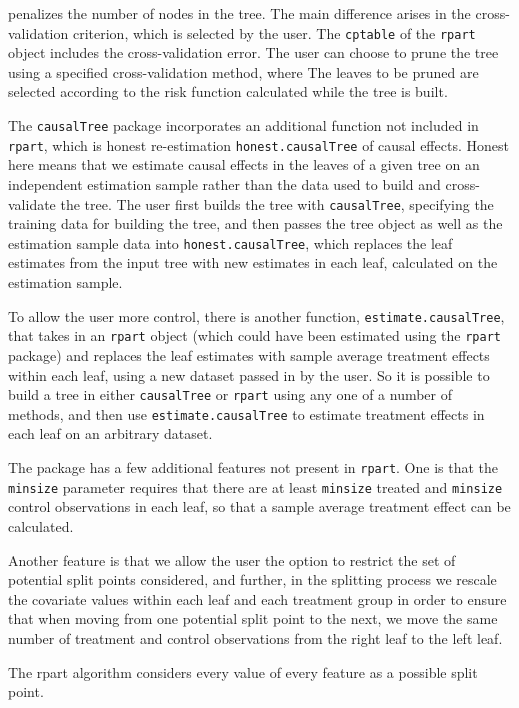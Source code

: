 \documentclass[11pt]{article}
\begin{document}
penalizes the number of nodes in the tree.  The main difference arises in the cross-validation criterion, which is 
selected by the user.  The \texttt{cptable} of the \texttt{rpart} object includes the cross-validation error.   The user can choose to prune the tree using a specified cross-validation method, where  The leaves to be pruned are selected according to the risk function calculated while
the tree is built. \par
The \texttt{causalTree} package incorporates an additional function not included in \texttt{rpart}, which is honest re-estimation \texttt{honest.causalTree} of causal effects. Honest here means that we estimate causal effects in the leaves of a given tree on an independent estimation sample rather than the data used to build and cross-validate the tree.  The user first builds the tree
with \texttt{causalTree}, specifying the training data for building the tree, and then passes the tree object as well as the estimation sample data
into \texttt{honest.causalTree}, which replaces the leaf estimates from the input tree with new estimates in each leaf, calculated on the estimation sample.\par
To allow the user more control, there is another function, \texttt{estimate.causalTree}, that takes in an \texttt{rpart} object (which could have been estimated using the \texttt{rpart} package) and
replaces the leaf estimates with sample average treatment effects within each leaf, using a new dataset passed in by the user.  So it is possible to build a tree in either \texttt{causalTree}
or \texttt{rpart} using any one of a number of methods, and
then use \texttt{estimate.causalTree} to estimate treatment effects in each leaf on an arbitrary dataset. \par
The package has a few additional features not present in \texttt{rpart}.  One is that the \texttt{minsize} parameter requires that there are at least \texttt{minsize} treated and
\texttt{minsize} control observations in each leaf, so that a sample average treatment effect can be calculated. \par
Another feature is that we allow the user the option to restrict the set of potential split points considered,
and further, in the splitting process we rescale the covariate values within each leaf and each treatment group
in order to ensure that when moving
from one potential split point to the next, we move the same number of treatment and control observations from the right leaf to the left leaf.  \par
The rpart algorithm considers every value of every feature as a possible split point.
\end{document}
